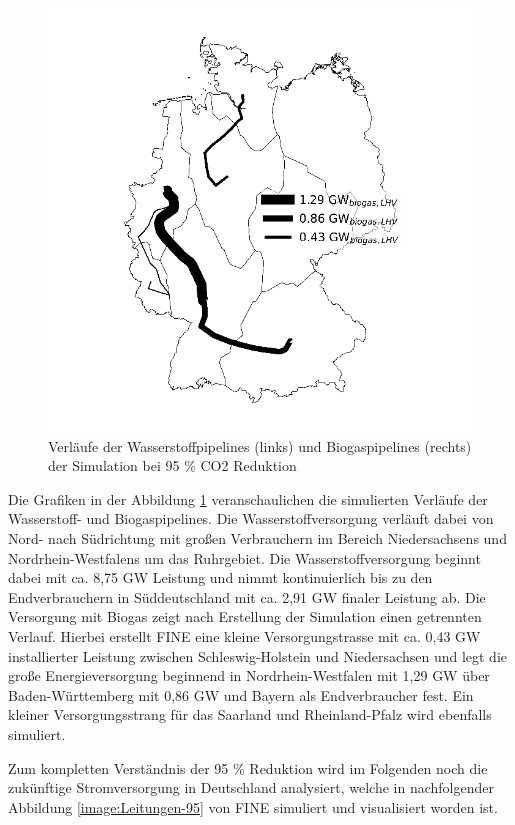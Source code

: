 \begin{figure}[!h]
\begin{minipage}[b]{.4\linewidth}
     \includegraphics{images/BiogasPipeline-95.png}
  \end{minipage}
  \caption{Verläufe der Wasserstoffpipelines (links) und Biogaspipelines (rechts) der Simulation bei 95 \% CO2 Reduktion}
  \label{image:Pipelines-95}
\end{figure}

Die Grafiken in der Abbildung \ref{image:Pipelines-95} veranschaulichen die simulierten Verläufe der Wasserstoff- und Biogaspipelines. Die Wasserstoffversorgung verläuft dabei von Nord- nach Südrichtung mit großen Verbrauchern im Bereich Niedersachsens und Nordrhein-Westfalens um das Ruhrgebiet. Die Wasserstoffversorgung beginnt dabei mit ca. 8,75 GW Leistung und nimmt kontinuierlich bis zu den Endverbrauchern in Süddeutschland mit ca. 2,91 GW finaler Leistung ab. Die Versorgung mit Biogas zeigt nach Erstellung der Simulation einen getrennten Verlauf. Hierbei erstellt FINE eine kleine Versorgungstrasse mit ca. 0,43 GW installierter Leistung zwischen Schleswig-Holstein und Niedersachsen und legt die große Energieversorgung beginnend in Nordrhein-Westfalen mit 1,29 GW über Baden-Württemberg mit 0,86 GW und Bayern als Endverbraucher fest. Ein kleiner Versorgungsstrang für das Saarland und Rheinland-Pfalz wird ebenfalls simuliert.

Zum kompletten Verständnis der 95 \% Reduktion wird im Folgenden noch die zukünftige Stromversorgung in Deutschland analysiert, welche in nachfolgender Abbildung \ref{image:Leitungen-95} von FINE simuliert und visualisiert worden ist.

